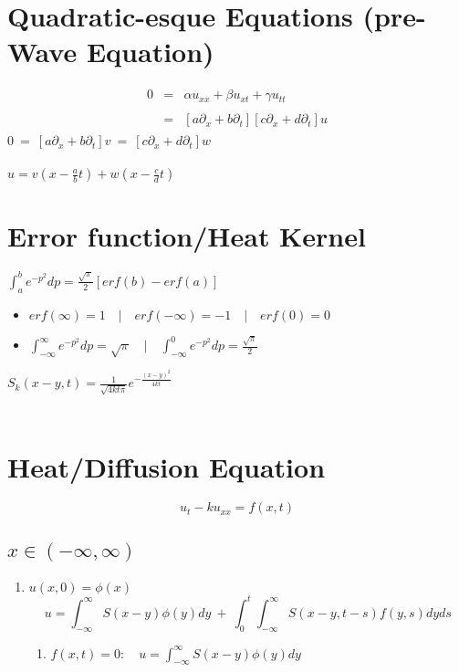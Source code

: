 \documentclass[12pt]{article}
\newcommand\bitalicmath{\mathversion{bitalic}}
\begin{document}
\section{Quadratic-esque Equations (pre-Wave Equation)}
\boldmath \begin{eqnarray*}
 0 &=& \alpha u_{xx}  + \beta u_{xt} + \gamma u_{tt} \\ \\
	&=& [a\partial_x + b\partial_t][c\partial_x + d\partial_t]u \\
\end{eqnarray*} \unboldmath
$0 \ =\ [a\partial_x + b\partial_t] v\ =\ [c\partial_x + d\partial_t] w$ \\ \\
$u = v \left( x - \frac{a}{b}t \right) + w \left( x - \frac{c}{d}t \right)$ \\

\section{Error function/Heat Kernel}
$\int_{a}^{b} e^{-p^2}dp = \displaystyle\frac{\sqrt{\pi}}{2}[erf(b) - erf(a)]$
\begin{itemize}
	\item $erf(\infty) = 1 \quad|\quad erf(-\infty) = -1 \quad|\quad erf(0) = 0$
	\item $\int_{-\infty}^{\infty} e^{-p^2}dp = \sqrt{\pi} \quad|\quad \int_{-\infty}^{0} e^{-p^2}dp = \displaystyle\frac{\sqrt{\pi}}{2}$ \\
\end{itemize}
$S_k(x-y,t) = \frac{1}{\sqrt{4kt\pi}}e^{-\frac{(x-y)^2}{4kt}}$ \\ \\
\pagebreak

\section{Heat/Diffusion Equation}
\boldmath $$u_t - ku_{xx} = f(x,t)$$ \unboldmath
\subsection{\boldmath $x \in (-\infty, \infty)$ \unboldmath \\}
	\begin{enumerate}
	\item {\bitalicmath $ u(x,0) = \phi(x)$}
	$$u = \displaystyle\int_{-\infty}^{\infty}S(x-y)\phi(y)dy \ +\  \int_{0}^{t}\int_{-\infty}^{\infty}S(x-y,t-s)f(y,s)dyds$$
		\begin{enumerate}
		\item {\boldmath $f(x,t) = 0:$}\  \ $u = \displaystyle\int_{-\infty}^{\infty}S(x-y)\phi(y)dy$ \\
		\end{enumerate}
	\end{enumerate}
\end{document}

